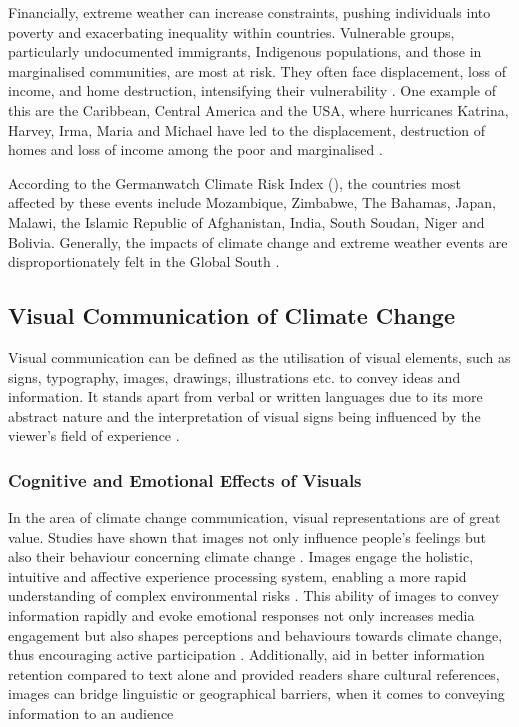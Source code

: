 Financially, extreme weather can increase constraints, pushing individuals into poverty and exacerbating inequality within countries. Vulnerable groups, particularly undocumented immigrants, Indigenous populations, and those in marginalised communities, are most at risk. They often face displacement, loss of income, and home destruction, intensifying their vulnerability \parencite[1206]{ipcc2023_wg2_8}. One example of this are the Caribbean, Central America and the USA, where hurricanes Katrina, Harvey, Irma, Maria and Michael have led to the displacement, destruction of homes and loss of income among the poor and marginalised \parencite{Klinenberg2020}.

According to the Germanwatch Climate Risk Index (\citeyear{Germanwatch2021}),  the countries most affected by these events include Mozambique, Zimbabwe, The Bahamas, Japan, Malawi, the Islamic Republic of Afghanistan, India, South Soudan, Niger and Bolivia. Generally, the impacts of climate change and extreme weather events are disproportionately felt in the Global South \parencite[1180]{ipcc2023_wg2_8}.

\subsection{Visual Communication of Climate Change}

Visual communication can be defined as the utilisation of visual elements, such as signs, typography, images, drawings, illustrations etc. to convey ideas and information. It stands apart from verbal or written languages due to its more abstract nature and the interpretation of visual signs being influenced by the viewer's field of experience \parencite{Smith2004}.

\subsubsection{Cognitive and Emotional Effects of Visuals}

In the area of climate change communication, visual representations are of great value. Studies have shown that images not only influence people's feelings but also their behaviour concerning climate change \parencite{Leiserowitz2006}. Images engage the holistic, intuitive and affective experience processing system, enabling a more rapid understanding of complex environmental risks \parencite{Epstein1994, Joffe2008}. This ability of images to convey information rapidly and evoke emotional responses not only increases media engagement but also shapes perceptions and behaviours towards climate change, thus encouraging active participation \parencite{Keib2018}. Additionally, aid in better information retention compared to text alone \parencite{Coleman2009, Graber1990} and provided readers share cultural references, images can bridge linguistic or geographical barriers, when it comes to conveying information to an audience \parencite{Armfield2013}

